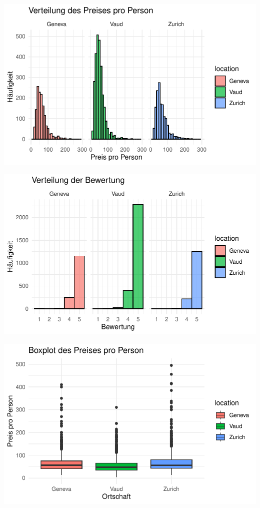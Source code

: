 \documentclass[
  journal,
]{IEEEtran}%
\begin{document}
\includegraphics{main_files/figure-pdf/descriptive-1.pdf}

\includegraphics{main_files/figure-pdf/descriptive-2.pdf}

\includegraphics{main_files/figure-pdf/descriptive-3.pdf}
\end{document}
